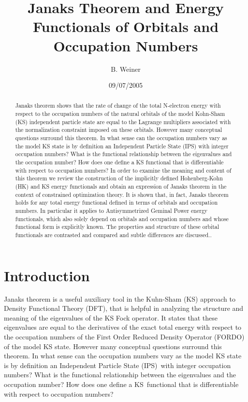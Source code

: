 \documentclass[aps,preprint]{revtex4}%
\begin{document}
\preprint{ }
\title[Janaks Theorem]{Janaks Theorem and Energy Functionals of Orbitals and Occupation Numbers}
\author{B. Weiner}
\keywords{}
\pacs{}

\begin{abstract}
Janaks theorem shows that the rate of change of the total N-electron energy
with respect to the occupation numbers of the natural orbitals of the model
Kohn-Sham (KS) independent particle state are equal to the Lagrange
multipliers associated with the normalization constraint imposed on these
orbitals. However many conceptual questions surround this theorem. In what
sense can the occupation numbers vary as the model KS state is by definition
an Independent Particle State (IPS) with integer occupation numbers? What is
the functional relationship between the eigenvalues and the occupation number?
How does one define a KS functional that is differentiable with respect to
occupation numbers? In order to examine the meaning and content of this
theorem we review the construction of the implicitly defined Hohenberg-Kohn
(HK) and KS energy functionals and obtain an expression of Janaks theorem in
the context of constrained optimization theory. It is shown that, in fact,
Janaks theorem holds for any total energy functional defined in terms of
orbitals and occupation numbers. In particular it applies to Antisymmetrized
Geminal Power energy functionals, which also solely depend on orbitals and
occupation numbers and whose functional form is explicitly known. The
properties and structure of these orbital functionals are contrasted and
compared and subtle differences are discussed..\qquad

\end{abstract}
\date{09/07/2005}
\maketitle
\tableofcontents


\section{Introduction\label{Intro}}

Janaks theorem is a useful auxiliary tool in the Kuhn-Sham (KS) approach to
Density Functional Theory (DFT), that is helpful in analyzing the structure
and meaning of the eigenvalues of the KS Fock operator. It states that these
eigenvalues are equal to the derivatives of the exact total energy with
respect to the occupation numbers of the First Order Reduced Density Operator
(FORDO) of the model KS state. However many conceptual questions surround this
theorem. In what sense can the occupation numbers vary as the model KS state
is by definition an Independent Particle State (IPS)\ with integer occupation
numbers? What is the functional relationship between the eigenvalues and the
occupation number? How does one define a KS\ functional that is differentiable
with respect to occupation numbers?
\end{document}
